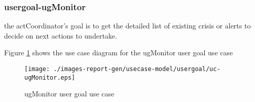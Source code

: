 \subsubsection{usergoal-ugMonitor}

\label{RE-use-case-ugMonitor}



the actCoordinator's goal is to get the detailed list of existing crisis or alerts to decide on next actions to undertake. 


\begin{usecase}
  











\end{usecase} 


Figure \ref{fig:lu.uni.lassy.excalibur.examples.icrash-RE-UCD-uc-ugMonitor}
shows the use case diagram for the ugMonitor user goal use case

\begin{figure}[htbp]
\begin{center}

\texttt{[image: ./images-report-gen/usecase-model/usergoal/uc-ugMonitor.eps]}
\end{center}
\caption[lu.uni.lassy.excalibur.examples.icrash Use Case Diagram: uc-ugMonitor]{ ugMonitor user goal use case}
\label{fig:lu.uni.lassy.excalibur.examples.icrash-RE-UCD-uc-ugMonitor}
\end{figure}
\vspace{0.5cm}
